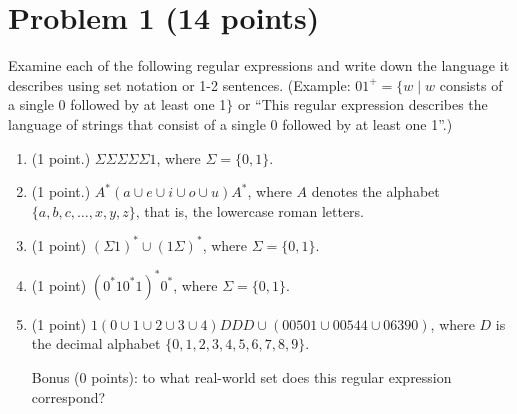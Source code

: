 \documentclass[letterpaper,11pt,twoside]{article}
\theoremstyle{plain}
\theoremstyle{definition}
\theoremstyle{remark}
\theoremstyle{restate}
\begin{document}
\clearpage
\section*{Problem 1 (14 points)}

Examine each of the following regular expressions and write down the language it describes using set notation or 1-2 sentences. (Example: $01^+ = \{w \; | \; w $ consists of a single 0 followed by at least one 1$\}$ or ``This regular expression describes the language of strings that consist of a single 0 followed by at least one 1''.)

\begin{enumerate}
    \item (1 point.) $\Sigma\Sigma\Sigma\Sigma\Sigma 1$, where $\Sigma = \{0,1\}$.
    
    \item (1 point.) $A^*(a \cup e \cup i \cup o \cup u)A^*$, where $A$ denotes the alphabet $\{a, b, c, \dots, x, y, z\}$, that is, the lowercase roman letters.
    
    \item (1 point) $(\Sigma 1)^* \cup (1 \Sigma)^*$, where $\Sigma = \{0, 1\}$. 
    
    \item (1 point) $(0^*10^*1)^*0^*$, where $\Sigma = \{0, 1\}$.

    \item (1 point) $1(0 \cup 1 \cup 2 \cup 3 \cup 4)DDD \cup (00501 \cup 00544 \cup 06390)$, where $D$ is the decimal alphabet $\{0, 1, 2, 3, 4, 5, 6, 7, 8, 9\}$. 
    
    Bonus (0 points): to what real-world set does this regular expression correspond?
\end{enumerate}
\end{document}
